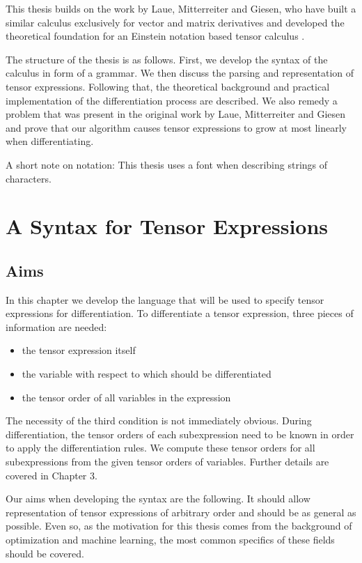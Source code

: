 \documentclass[12pt, a4paper]{report} %
\begin{document}
This thesis builds on the work by Laue, Mitterreiter and Giesen, who have built a similar calculus exclusively for vector and matrix derivatives \cite{matrixpaper} and developed the theoretical foundation for an Einstein notation based tensor calculus \cite{tensorpaper}.

The structure of the thesis is as follows.
First, we develop the syntax of the calculus in form of a grammar.
We then discuss the parsing and representation of tensor expressions.
Following that, the theoretical background and practical implementation of the differentiation process are described.
We also remedy a problem that was present in the original work \cite{tensorpaper} by Laue, Mitterreiter and Giesen and prove that our algorithm causes tensor expressions to grow at most linearly when differentiating.

A short note on notation: This thesis uses a  font when describing strings of characters.

\chapter{A Syntax for Tensor Expressions}
\section{Aims}
In this chapter we develop the language that will be used to specify tensor expressions for differentiation.
To differentiate a tensor expression, three pieces of information are needed: 
\begin{itemize}
    \item the tensor expression itself
    \item the variable with respect to which should be differentiated
    \item the tensor order of all variables in the expression
\end{itemize}
The necessity of the third condition is not immediately obvious.
During differentiation, the tensor orders of each subexpression need to be known in order to apply the differentiation rules.
We compute these tensor orders for all subexpressions from the given tensor orders of variables.
Further details are covered in Chapter 3.

Our aims when developing the syntax are the following.
It should allow representation of tensor expressions of arbitrary order and should be as general as possible.
Even so, as the motivation for this thesis comes from the background of optimization and machine learning, the most common specifics of these fields should be covered.
\end{document}
